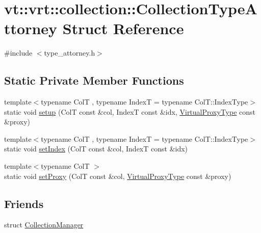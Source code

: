 \hypertarget{structvt_1_1vrt_1_1collection_1_1_collection_type_attorney}{}\section{vt\+:\+:vrt\+:\+:collection\+:\+:Collection\+Type\+Attorney Struct Reference}
\label{structvt_1_1vrt_1_1collection_1_1_collection_type_attorney}


{\ttfamily \#include $<$type\+\_\+attorney.\+h$>$}

\subsection*{Static Private Member Functions}
\begin{DoxyCompactItemize}
\item 
{\footnotesize template$<$typename ColT , typename IndexT  = typename Col\+T\+::\+Index\+Type$>$ }\\static void \hyperlink{structvt_1_1vrt_1_1collection_1_1_collection_type_attorney_aa6bf71b0055c677e8defea7fa71392b9}{setup} (ColT const \&col, IndexT const \&idx, \hyperlink{namespacevt_a1b417dd5d684f045bb58a0ede70045ac}{Virtual\+Proxy\+Type} const \&proxy)
\item 
{\footnotesize template$<$typename ColT , typename IndexT  = typename Col\+T\+::\+Index\+Type$>$ }\\static void \hyperlink{structvt_1_1vrt_1_1collection_1_1_collection_type_attorney_a871fe158dedc6747008cc501cfa076e5}{set\+Index} (ColT const \&col, IndexT const \&idx)
\item 
{\footnotesize template$<$typename ColT $>$ }\\static void \hyperlink{structvt_1_1vrt_1_1collection_1_1_collection_type_attorney_ab33159c686d52995eeb6898a1835fbbd}{set\+Proxy} (ColT const \&col, \hyperlink{namespacevt_a1b417dd5d684f045bb58a0ede70045ac}{Virtual\+Proxy\+Type} const \&proxy)
\end{DoxyCompactItemize}
\subsection*{Friends}
\begin{DoxyCompactItemize}
\item 
struct \hyperlink{structvt_1_1vrt_1_1collection_1_1_collection_type_attorney_af9288b1963f434a90b307b5305a49510}{Collection\+Manager}
\end{DoxyCompactItemize}


